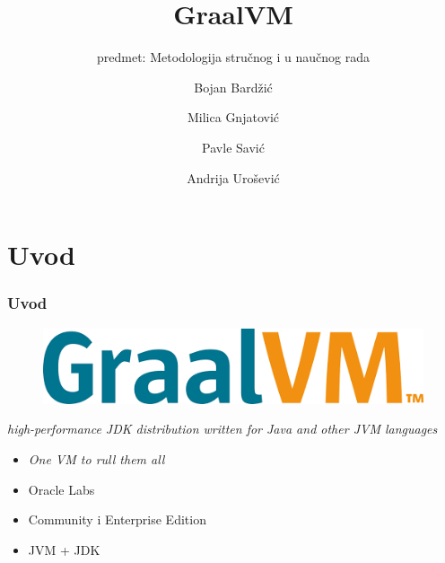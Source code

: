 \documentclass{beamer}
\title{GraalVM}
\subtitle{predmet: Metodologija stručnog i u naučnog rada}
\author{Bojan Bardžić \and Milica Gnjatović \and Pavle Savić \and Andrija Urošević}
\institute{Matematički fakultet}
\date{}
\begin{document}
	
	\begin{frame}
		\titlepage
	\end{frame}
	
	\section{Uvod}
	\begin{frame}
		\frametitle{Uvod}
		
		\begin{figure}
			\begin{center}
				\includegraphics[width=0.5\linewidth]{imgs/graalvm_logo.png}	
			\end{center} 
		\end{figure}
	
		\center	
		\textit{high-performance JDK distribution written for Java and other JVM languages}

		\begin{flushleft}
			\begin{itemize}
				\item \emph{One VM to rull them all}
				\item Oracle Labs
				\item Community i Enterprise Edition
				\item JVM + JDK	
			\end{itemize}
		\end{flushleft}


	\end{frame}
\end{document}
